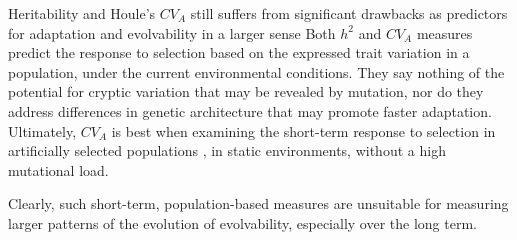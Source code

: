 Heritability and Houle’s $CV_A$ still suffers from significant drawbacks as predictors for adaptation and evolvability in a larger sense \cite{hansen_heritability_2011} Both $h^2$ and $CV_A$ measures predict the response to selection based on the expressed trait variation in a population, under the current environmental conditions. They say nothing of the potential for cryptic variation that may be revealed by mutation, nor do they address differences in genetic architecture that may promote faster adaptation. Ultimately, $CV_A$ is best when examining the short-term response to selection in artificially selected populations \cite{houle_comparing_1992}, in static environments, without a high mutational load.

Clearly, such short-term, population-based measures are unsuitable for measuring larger patterns of the evolution of evolvability, especially over the long term.

